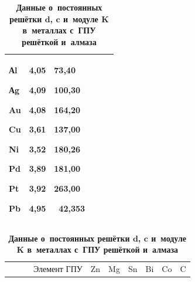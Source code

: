 \begin{table}[b!]
\begin{minipage}{.88\textwidth}
\begin{tabular}{p{1.8cm}|p{1.4cm}|p{1.4cm}|p{1.8cm}|p{1.4cm}|p{1.4cm}}
Аl \par Аg \par Au \par Cu \par Ni \par Pd \par Pt \par Pb& \centering

4,05 \par 4,09 \par 4,08 \par 3,61 \par 3,52 \par 3,89 \par 3,92 \par 4,95& {\centering

73,40 \par 100,30 \par 164,20 \par 137,00 \par 180,26 \par 181,00 \par 263,00 \par ~42,353  }\\

\hline

\end{tabular}

\end{minipage}



\bigskip

\bigskip



\begin{minipage}{.88\textwidth}

\centering

\caption{\bf Данные о~постоянных решётки $\boldsymbol d$, $\boldsymbol c$ и~модуле $\boldsymbol K$ в~металлах с~ГПУ решёткой и~алмаза}\vspace{-3mm}

\begin{tabular}{p{3.8cm}|c|c|c|c|c|c}

\hline

~~~~~~Элемент ГПУ& 

Zn& 

Mg& 

Sn& 

Bi& 

Co& 

C \\


\end{tabular}
\end{minipage}
\end{table}

